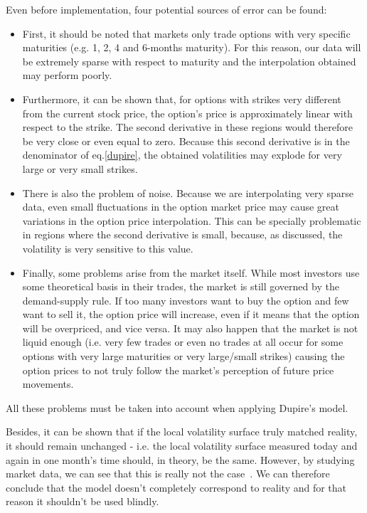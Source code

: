 Even before implementation, four potential sources of error can be found:
\begin{itemize}
\item First, it should be noted that markets only trade options with very specific maturities (e.g. 1, 2, 4 and 6-months maturity). For this reason, our data will be extremely sparse with respect to maturity and the interpolation obtained may perform poorly.
\item Furthermore, it can be shown that, for options with strikes very different from the current stock price, the option's price is approximately linear with respect to the strike. The second derivative in these regions would therefore be very close or even equal to zero. Because this second derivative is in the denominator of eq.\eqref{dupire}, the obtained volatilities may explode for very large or very small strikes.
\item There is also the problem of noise. Because we are interpolating very sparse data, even small fluctuations in the option market price may cause great variations in the option price interpolation. This can be specially problematic in regions where the second derivative is small, because, as discussed, the volatility is very sensitive to this value.
\item Finally, some problems arise from the market itself. While most investors use some theoretical basis in their trades, the market is still governed by the demand-supply rule. If too many investors want to buy the option and few want to sell it, the option price will increase, even if it means that the option will be overpriced, and vice versa. It may also happen that the market is not liquid enough (i.e. very few trades or even no trades at all occur for some options with very large maturities or very large/small strikes) causing the option prices to not truly follow the market's perception of future price movements.
\end{itemize}
All these problems must be taken into account when applying Dupire's model.

Besides, it can be shown that if the local volatility surface truly matched reality, it should remain unchanged - i.e. the local volatility surface measured today and again in one month's time should, in theory, be the same. However, by studying market data, we can see that this is really not the case~\cite{Wilmott3}. We can therefore conclude that the model doesn't completely correspond to reality and for that reason it shouldn't be used blindly.


